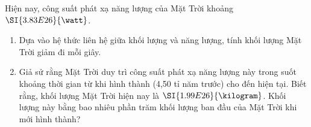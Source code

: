 \begin{ex}
	Hiện nay, công suất phát xạ năng lượng của Mặt Trời khoảng $\SI{3.83E26}{\watt}$.
	\begin{enumerate}[label=\alph*)]
		\item Dựa vào hệ thức liên hệ giữa khối lượng và năng lượng, tính khối lượng Mặt Trời giảm đi mỗi giây.
		\item Giả sử rằng Mặt Trời duy trì công suất phát xạ năng lượng này trong suốt khoảng thời gian từ khi hình thành (4,50 tỉ năm trước) cho đến hiện tại. Biết rằng, khối lượng Mặt Trời hiện nay là $\SI{1.99E26}{\kilogram}$. Khối lượng này bằng bao nhiêu phần trăm khối lượng ban đầu của Mặt Trời khi mới hình thành?
	\end{enumerate}
\end{ex}
